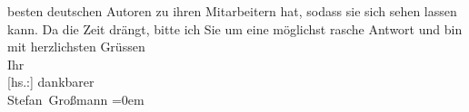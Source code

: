 \begin{ledgroupsized}[t]{13cm}
               besten deutschen Autoren zu ihren Mitarbeitern hat, sodass sie sich sehen lassen
               kann.\pend
           \pstart
           {\pb}Da die Zeit drängt, bitte ich Sie um eine
               möglichst rasche Antwort und bin\pend
           \pstart
           mit herzlichsten Grüssen{\\[\baselineskip]}Ihr{\\[\baselineskip]}{[}hs.:{]} dankbarer{\\[\baselineskip]}\spacefill\mbox{Stefan Großmann}\pend
           \leftskip=0em{}\endnumbering{}\end{ledgroupsized}  \newcommand{\dateiname}{L02378}\newcommand{\titel}{Stefan Großmann an Arthur Schnitzler, 26. 4. 1922}\newcommand{\editorInnen}{ Martin Anton Müller und Gerd-Hermann Susen}
      